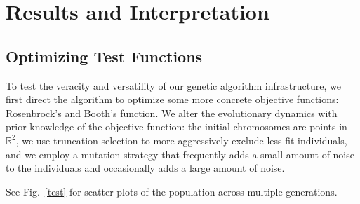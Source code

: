 \documentclass[conference]{IEEEtran}
\begin{document}
\section{Results and Interpretation}

\subsection{Optimizing Test Functions}

To test the veracity and versatility of our genetic algorithm infrastructure,
we first direct the algorithm to optimize some more concrete objective
functions: Rosenbrock's and Booth's function. We alter the evolutionary
dynamics with prior knowledge of the objective function: the initial
chromosomes are points in $\mathbb{R}^2$, we use truncation selection
to more aggressively exclude less fit individuals, and we employ a mutation
strategy that frequently adds a small amount of noise to the individuals and
occasionally adds a large amount of noise.

See Fig.~\ref{test} for scatter plots of the population across
multiple generations.
\end{document}
